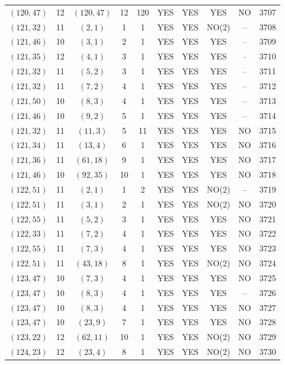 \begin{longtable}{|c|c|c|c|c|c|c|c|c|c|}
$(120, 47)$ & 12 & $(120, 47)$ & 12 & 120 & YES & YES & YES & NO & 3707\\
$(121, 32)$ & 11 & $(2, 1)$ & 1 & 1 & YES & YES & NO(2) & -- & 3708\\
$(121, 46)$ & 10 & $(3, 1)$ & 2 & 1 & YES & YES & YES & -- & 3709\\
$(121, 35)$ & 12 & $(4, 1)$ & 3 & 1 & YES & YES & YES & -- & 3710\\
$(121, 32)$ & 11 & $(5, 2)$ & 3 & 1 & YES & YES & YES & -- & 3711\\
$(121, 32)$ & 11 & $(7, 2)$ & 4 & 1 & YES & YES & YES & -- & 3712\\
$(121, 50)$ & 10 & $(8, 3)$ & 4 & 1 & YES & YES & YES & -- & 3713\\
$(121, 46)$ & 10 & $(9, 2)$ & 5 & 1 & YES & YES & YES & -- & 3714\\
$(121, 32)$ & 11 & $(11, 3)$ & 5 & 11 & YES & YES & YES & NO & 3715\\
$(121, 34)$ & 11 & $(13, 4)$ & 6 & 1 & YES & YES & YES & NO & 3716\\
$(121, 36)$ & 11 & $(61, 18)$ & 9 & 1 & YES & YES & YES & NO & 3717\\
$(121, 46)$ & 10 & $(92, 35)$ & 10 & 1 & YES & YES & YES & NO & 3718\\
$(122, 51)$ & 11 & $(2, 1)$ & 1 & 2 & YES & YES & NO(2) & -- & 3719\\
$(122, 51)$ & 11 & $(3, 1)$ & 2 & 1 & YES & YES & NO(2) & NO & 3720\\
$(122, 55)$ & 11 & $(5, 2)$ & 3 & 1 & YES & YES & YES & NO & 3721\\
$(122, 33)$ & 11 & $(7, 2)$ & 4 & 1 & YES & YES & YES & NO & 3722\\
$(122, 55)$ & 11 & $(7, 3)$ & 4 & 1 & YES & YES & YES & NO & 3723\\
$(122, 51)$ & 11 & $(43, 18)$ & 8 & 1 & YES & YES & NO(2) & NO & 3724\\
$(123, 47)$ & 10 & $(7, 3)$ & 4 & 1 & YES & YES & YES & NO & 3725\\
$(123, 47)$ & 10 & $(8, 3)$ & 4 & 1 & YES & YES & YES & -- & 3726\\
$(123, 47)$ & 10 & $(8, 3)$ & 4 & 1 & YES & YES & YES & NO & 3727\\
$(123, 47)$ & 10 & $(23, 9)$ & 7 & 1 & YES & YES & YES & NO & 3728\\
$(123, 22)$ & 12 & $(62, 11)$ & 10 & 1 & YES & YES & NO(2) & NO & 3729\\
$(124, 23)$ & 12 & $(23, 4)$ & 8 & 1 & YES & YES & NO(2) & NO & 3730\\

\end{longtable}
